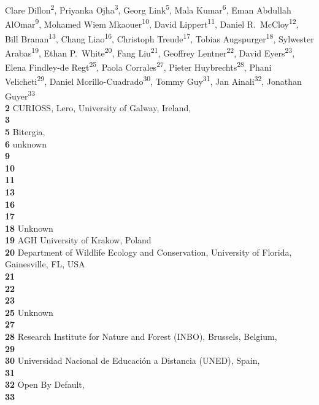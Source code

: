 Clare Dillon\textsuperscript{2},
Priyanka Ojha\textsuperscript{3},
Georg Link\textsuperscript{5},
Mala Kumar\textsuperscript{6},
Eman Abdullah AlOmar\textsuperscript{9},
Mohamed Wiem Mkaouer\textsuperscript{10},
David Lippert\textsuperscript{11},
Daniel R.\ McCloy\textsuperscript{12},
Bill Branan\textsuperscript{13},
Chang Liao\textsuperscript{16},
Christoph Treude\textsuperscript{17},
Tobias Augspurger\textsuperscript{18},
Sylwester Arabas\textsuperscript{19},
Ethan P.\ White\textsuperscript{20},
Fang Liu\textsuperscript{21},
Geoffrey Lentner\textsuperscript{22},
David Eyers\textsuperscript{23},
Elena Findley-de Regt\textsuperscript{25},
Paola Corrales\textsuperscript{27},
Pieter Huybrechts\textsuperscript{28},
Phani Velicheti\textsuperscript{29},
Daniel Morillo-Cuadrado\textsuperscript{30},
Tommy Guy\textsuperscript{31},
Jan Ainali\textsuperscript{32},
Jonathan Guyer\textsuperscript{33}
\\
\bigskip
\textbf{2} CURIOSS, Lero, University of Galway, Ireland, \\
\textbf{3} \\
\textbf{5} Bitergia, \\
\textbf{6} unknown\\
\textbf{9} \\
\textbf{10} \\
\textbf{11} \\
\textbf{13} \\
\textbf{16} \\
\textbf{17} \\
\textbf{18} Unknown\\
\textbf{19} AGH University of Krakow, Poland \\
\textbf{20} Department of Wildlife Ecology and Conservation, University of Florida, Gainesville, FL, USA \\
\textbf{21} \\
\textbf{22} \\
\textbf{23} \\
\textbf{25} Unknown\\
\textbf{27} \\
\textbf{28} Research Institute for Nature and Forest (INBO), Brussels, Belgium, \\
\textbf{29} \\
\textbf{30} Universidad Nacional de Educación a Distancia (UNED), Spain, \\
\textbf{31} \\
\textbf{32} Open By Default, \\
\textbf{33} \\
